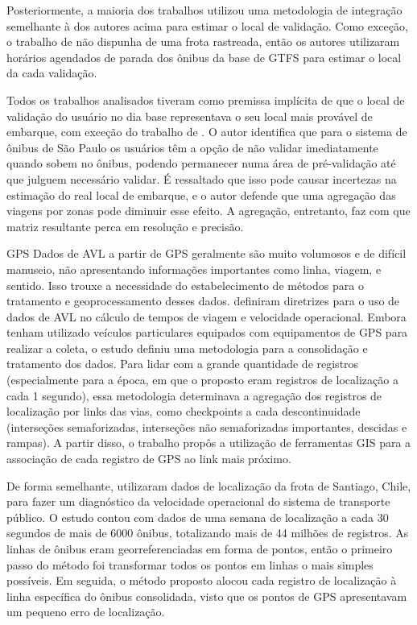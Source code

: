\documentclass[        
    a4paper,          %
    12pt,             %
    chapter=TITLE,    %
    section=Title,    %
    subsection=Title, %
    oneside,          %
    english,          %
    spanish,          %
    brazil,           %
    fleqn             %
]{abntex2}
\begin{document}
  Posteriormente, a maioria dos trabalhos utilizou uma metodologia de integração semelhante à dos autores acima para estimar o local de validação. Como exceção, o trabalho de \citet{Nassir2011} não dispunha de uma frota rastreada, então os autores utilizaram horários agendados de parada dos ônibus da base de GTFS para estimar o local da cada validação.
  
  Todos os trabalhos analisados tiveram como premissa implícita de que o local de validação do usuário no dia base representava o seu local mais provável de embarque, com exceção do trabalho de \citet{Farzin2008}. O autor identifica que para o sistema de ônibus de São Paulo os usuários têm a opção de não validar imediatamente quando sobem no ônibus, podendo permanecer numa área de pré-validação até que julguem necessário validar. É ressaltado que isso pode causar incertezas na estimação do real local de embarque, e o autor defende que uma agregação das viagens por zonas pode diminuir esse efeito. A agregação, entretanto, faz com que matriz resultante perca em resolução e precisão.
  
  GPS
  Dados de AVL a partir de GPS geralmente são muito volumosos e de difícil manuseio, não apresentando informações importantes como linha, viagem, e sentido. Isso trouxe a necessidade do estabelecimento de métodos para o tratamento e geoprocessamento desses dados. \citet{Quiroga1998} definiram diretrizes para o uso de dados de AVL no cálculo de tempos de viagem e velocidade operacional. Embora tenham utilizado veículos particulares equipados com equipamentos de GPS para realizar a coleta, o estudo definiu uma metodologia para a consolidação e tratamento dos dados. Para lidar com a grande quantidade de registros (especialmente para a época, em que o proposto eram registros de localização a cada 1 segundo), essa metodologia determinava a agregação dos registros de localização por links das vias, como checkpoints a cada descontinuidade (interseções semaforizadas, interseções não semaforizadas importantes, descidas e rampas). A partir disso, o trabalho propôs a utilização de ferramentas GIS para a associação de cada registro de GPS ao link mais próximo.
  
  De forma semelhante, \citet{Cortes2011} utilizaram dados de localização da frota de Santiago, Chile, para fazer um diagnóstico da velocidade operacional do sistema de transporte público. O estudo contou com dados de uma semana de localização a cada 30 segundos de mais de 6000 ônibus, totalizando mais de 44 milhões de registros. As linhas de ônibus eram georreferenciadas em forma de pontos, então o primeiro passo do método foi transformar todos os pontos em linhas o mais simples possíveis. Em seguida, o método proposto alocou cada registro de localização à linha específica do ônibus consolidada, visto que os pontos de GPS apresentavam um pequeno erro de localização.
  
\end{document}
